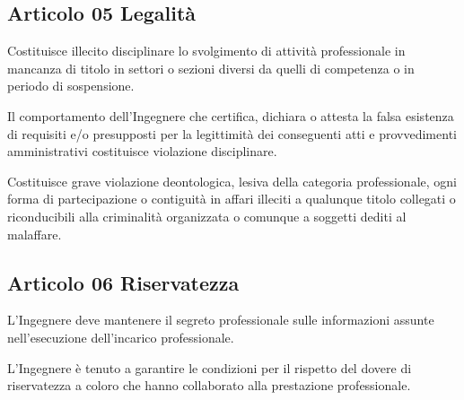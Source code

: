 \documentclass[letterpaper,10pt,italian]{sphinxmanual}
\begin{document}
\subsection{Articolo 05 \sphinxhyphen{} Legalità}
\label{\detokenize{capitoli/codice/codice_deontologico:articolo-05-legalita}}\begin{description}
\sphinxAtStartPar
Costituisce illecito disciplinare lo svolgimento di attività professionale in mancanza di titolo in settori o sezioni diversi da quelli di competenza o in periodo di sospensione.

\sphinxAtStartPar
Il comportamento dell’Ingegnere che certifica, dichiara o attesta la falsa esistenza di requisiti e/o presupposti per la legittimità dei conseguenti atti e provvedimenti amministrativi costituisce violazione disciplinare.

\sphinxAtStartPar
Costituisce grave violazione deontologica, lesiva della categoria professionale, ogni forma di partecipazione o contiguità in affari illeciti a qualunque titolo collegati o riconducibili alla criminalità organizzata o comunque a soggetti dediti al malaffare.

\end{description}


\subsection{Articolo 06 \sphinxhyphen{} Riservatezza}
\label{\detokenize{capitoli/codice/codice_deontologico:articolo-06-riservatezza}}\begin{description}
\sphinxAtStartPar
L’Ingegnere deve mantenere il segreto professionale sulle informazioni assunte nell’esecuzione dell’incarico professionale.

\sphinxAtStartPar
L’Ingegnere è tenuto a garantire le condizioni per il rispetto del dovere di riservatezza a coloro che hanno collaborato alla prestazione professionale.

\end{description}
\end{document}
